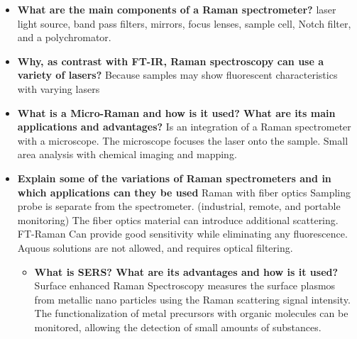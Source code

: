 \documentclass[11pt]{article}
\begin{document}
\begin{itemize}
  \item \relax \textbf{What are the main components of a Raman spectrometer?} \mbox{}\protect\newline * laser light source, band pass filters, mirrors, focus lenses, sample cell, Notch filter, and a polychromator. \mbox{}\protect\newline 
  \item \relax \textbf{Why, as contrast with FT-IR, Raman spectroscopy can use a variety of lasers?} \mbox{}\protect\newline * Because samples may show fluorescent characteristics with varying lasers \mbox{}\protect\newline 
  \item \relax \textbf{What is a Micro-Raman and how is it used? What are its main applications and advantages?} \mbox{}\protect\newline * Is an integration of a Raman spectrometer with a microscope. The microscope focuses the laser onto the sample. Small area analysis with chemical imaging and mapping. \mbox{}\protect\newline 
  \item \relax \textbf{Explain some of the variations of Raman spectrometers and in which applications can they be used} \mbox{}\protect\newline * Raman with fiber optics {\textemdash} Sampling probe is separate from the spectrometer. (industrial, remote, and portable monitoring) The fiber optics material can introduce additional scattering. \mbox{}\protect\newline FT-Raman {\textemdash} Can provide good sensitivity while eliminating any fluorescence. Aquous solutions are not allowed, and requires optical filtering. \mbox{}\protect\newline 

\begin{itemize}
  \item \relax \textbf{ What is SERS? What are its advantages and how is it used?} \mbox{}\protect\newline * Surface enhanced Raman Spectroscopy measures the surface plasmos from metallic nano particles using the Raman scattering signal intensity. The functionalization of metal precursors with organic molecules can be monitored, allowing the detection of small amounts of substances. \mbox{}\protect\newline 
\end{itemize}
  

\end{itemize}
\end{document}
